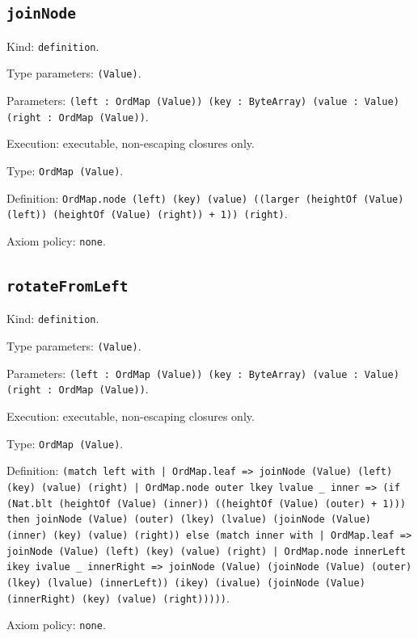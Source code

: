 \documentclass[11pt]{article}
\begin{document}
\subsection*{\texttt{joinNode}}
\noindent Kind: \texttt{definition}.\par
\noindent Type parameters: \texttt{(Value)}.\par
\noindent Parameters: \texttt{(left : OrdMap (Value)) (key : ByteArray) (value : Value) (right : OrdMap (Value))}.\par
\noindent Execution: executable, non-escaping closures only.\par
\noindent Type: \texttt{OrdMap (Value)}.\par
\noindent Definition: \texttt{OrdMap.node (left) (key) (value) ((larger (heightOf (Value) (left)) (heightOf (Value) (right)) + 1)) (right)}.\par
\noindent Axiom policy: \texttt{none}.\par
\subsection*{\texttt{rotateFromLeft}}
\noindent Kind: \texttt{definition}.\par
\noindent Type parameters: \texttt{(Value)}.\par
\noindent Parameters: \texttt{(left : OrdMap (Value)) (key : ByteArray) (value : Value) (right : OrdMap (Value))}.\par
\noindent Execution: executable, non-escaping closures only.\par
\noindent Type: \texttt{OrdMap (Value)}.\par
\noindent Definition: \texttt{(match left with | OrdMap.leaf => joinNode (Value) (left) (key) (value) (right) | OrdMap.node outer lkey lvalue \_ inner => (if (Nat.blt (heightOf (Value) (inner)) ((heightOf (Value) (outer) + 1))) then joinNode (Value) (outer) (lkey) (lvalue) (joinNode (Value) (inner) (key) (value) (right)) else (match inner with | OrdMap.leaf => joinNode (Value) (left) (key) (value) (right) | OrdMap.node innerLeft ikey ivalue \_ innerRight => joinNode (Value) (joinNode (Value) (outer) (lkey) (lvalue) (innerLeft)) (ikey) (ivalue) (joinNode (Value) (innerRight) (key) (value) (right)))))}.\par
\noindent Axiom policy: \texttt{none}.\par
\end{document}

